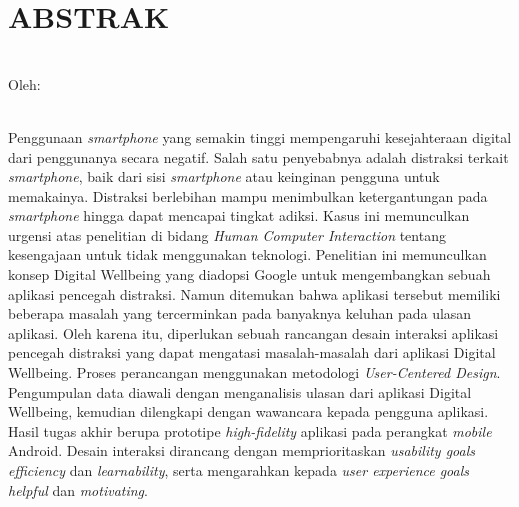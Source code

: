 \clearpage
\chapter*{ABSTRAK}

\begin{center}
  \textbf{\MakeUppercase{\thetitle}} \\[1em]
  
  Oleh: \\
  \MakeUppercase{\theauthor} \\
\end{center}

\begin{singlespace}
  Penggunaan \textit{smartphone} yang semakin tinggi mempengaruhi kesejahteraan digital dari penggunanya secara negatif.
  Salah satu penyebabnya adalah distraksi terkait \textit{smartphone}, baik dari sisi \textit{smartphone} atau keinginan pengguna untuk memakainya.
  Distraksi berlebihan mampu menimbulkan ketergantungan pada \textit{smartphone} hingga dapat mencapai tingkat adiksi.
  Kasus ini memunculkan urgensi atas penelitian di bidang \textit{Human Computer Interaction} tentang kesengajaan untuk tidak menggunakan teknologi.
  Penelitian ini memunculkan konsep Digital Wellbeing yang diadopsi Google untuk mengembangkan sebuah aplikasi pencegah distraksi.
  Namun ditemukan bahwa aplikasi tersebut memiliki beberapa masalah yang tercerminkan pada banyaknya keluhan pada ulasan aplikasi.
  Oleh karena itu, diperlukan sebuah rancangan desain interaksi aplikasi pencegah distraksi yang dapat mengatasi masalah-masalah dari aplikasi Digital Wellbeing.
  Proses perancangan menggunakan metodologi \textit{User-Centered Design}.
  Pengumpulan data diawali dengan menganalisis ulasan dari aplikasi Digital Wellbeing, kemudian dilengkapi dengan wawancara kepada pengguna aplikasi.
  Hasil tugas akhir berupa prototipe \textit{high-fidelity} aplikasi pada perangkat \textit{mobile} Android.
  Desain interaksi dirancang dengan memprioritaskan \textit{usability goals efficiency} dan \textit{learnability}, serta mengarahkan kepada \textit{user experience goals helpful} dan \textit{motivating}.

\end{singlespace}
